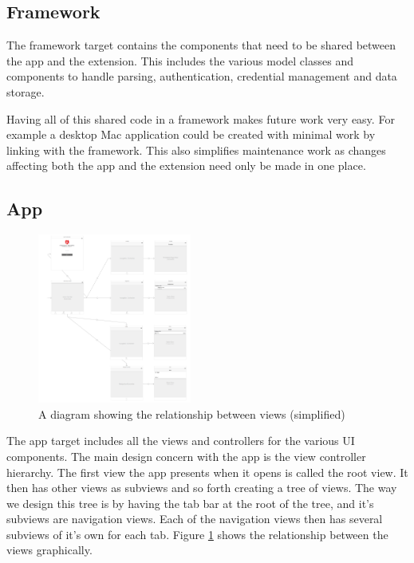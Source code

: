 \documentclass[pdftex, DIV=calc, paper=a4, fontsize=11pt]{scrartcl}	 %
\begin{document}
\subsection{Framework}
The framework target contains the components that need to be shared between the app and the extension.
This includes the various model classes and components to handle parsing, authentication, credential
management and data storage.

Having all of this shared code in a framework makes future work very easy. For example a desktop Mac
application could be created with minimal work by linking with the framework. This also simplifies
maintenance work as changes affecting both the app and the extension need only be made in one place.

\subsection{App}

\begin{figure}
    \centering
    \includegraphics[width=0.45\textwidth]{view-tree.png}
    \caption{A diagram showing the relationship between views (simplified)}
    \label{fig:hierarchy}
\end{figure}

The app target includes all the views and controllers for the various UI components. 
The main design concern with the app is the view controller hierarchy. The first view the app 
presents when it opens is called the root view. It then has other views as subviews and so forth
creating a tree of views. The way we design this tree is by having the tab bar at the root of the
tree, and it's subviews are navigation views. Each of the navigation views then has several subviews
of it's own for each tab. Figure \ref{fig:hierarchy} shows the relationship between the views
graphically.
\end{document}
